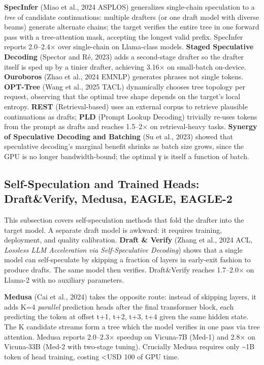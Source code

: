 \textbf{SpecInfer} (Miao et al., 2024 ASPLOS) generalizes single-chain speculation to a \emph{tree} of candidate continuations: multiple drafters (or one draft model with diverse beams) generate alternate chains; the target verifies the entire tree in one forward pass with a tree-attention mask, accepting the longest valid prefix. SpecInfer reports 2.0--2.4× over single-chain on Llama-class models. \textbf{Staged Speculative Decoding} (Spector and Ré, 2023) adds a second-stage drafter so the drafter itself is sped up by a tinier drafter, achieving 3.16× on small-batch on-device. \textbf{Ouroboros} (Zhao et al., 2024 EMNLP) generates phrases not single tokens. \textbf{OPT-Tree} (Wang et al., 2025 TACL) dynamically chooses tree topology per request, observing that the optimal tree shape depends on the target's local entropy. \textbf{REST} (Retrieval-based) uses an external corpus to retrieve plausible continuations as drafts; \textbf{PLD} (Prompt Lookup Decoding) trivially re-uses tokens from the prompt as drafts and reaches 1.5--2× on retrieval-heavy tasks. \textbf{Synergy of Speculative Decoding and Batching} (Su et al., 2023) showed that speculative decoding's marginal benefit shrinks as batch size grows, since the GPU is no longer bandwidth-bound; the optimal γ is itself a function of batch.

\subsection{Self-Speculation and Trained Heads: Draft\&Verify, Medusa, EAGLE, EAGLE-2}\label{self-speculation-and-trained-heads-draftverify-medusa-eagle-eagle-2}

This subsection covers self-speculation methods that fold the drafter into the target model. A separate draft model is awkward: it requires training, deployment, and quality calibration. \textbf{Draft \& Verify} (Zhang et al., 2024 ACL, \emph{Lossless LLM Acceleration via Self-Speculative Decoding}) shows that a single model can self-speculate by skipping a fraction of layers in early-exit fashion to produce drafts. The same model then verifies. Draft\&Verify reaches 1.7--2.0× on Llama-2 with no auxiliary parameters.

\textbf{Medusa} (Cai et al., 2024) takes the opposite route: instead of skipping layers, it adds K=4 \emph{parallel} prediction heads after the final transformer block, each predicting the token at offset t+1, t+2, t+3, t+4 given the same hidden state. The K candidate streams form a tree which the model verifies in one pass via tree attention. Medusa reports 2.0--2.3× speedup on Vicuna-7B (Med-1) and 2.8× on Vicuna-33B (Med-2 with two-stage tuning). Crucially Medusa requires only \textasciitilde1B token of head training, costing \textless USD 100 of GPU time.

